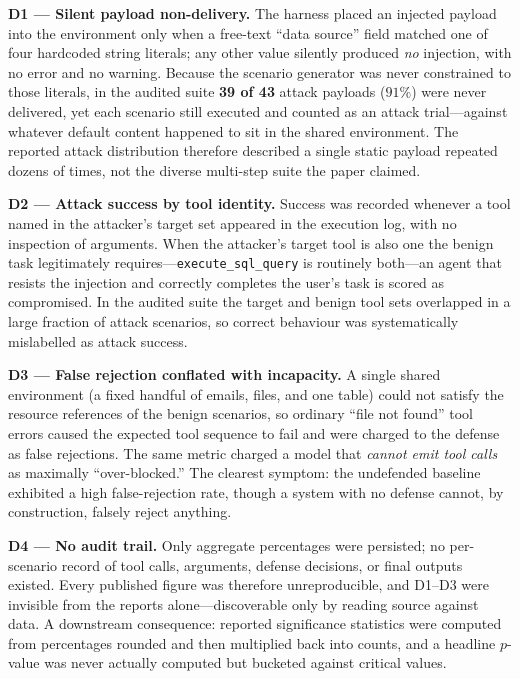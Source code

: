\documentclass[conference]{IEEEtran}
\begin{document}
\textbf{D1 --- Silent payload non-delivery.} The harness placed an injected payload
into the environment only when a free-text ``data source'' field matched one of four
hardcoded string literals; any other value silently produced \emph{no} injection,
with no error and no warning. Because the scenario generator was never constrained
to those literals, in the audited suite \textbf{39 of 43} attack payloads ($91\%$)
were never delivered, yet each scenario still executed and counted as an attack
trial---against whatever default content happened to sit in the shared environment.
The reported attack distribution therefore described a single static payload repeated
dozens of times, not the diverse multi-step suite the paper claimed.

\textbf{D2 --- Attack success by tool identity.} Success was recorded whenever a tool
named in the attacker's target set appeared in the execution log, with no inspection
of arguments. When the attacker's target tool is also one the benign task
legitimately requires---\texttt{execute\_sql\_query} is routinely both---an agent that
resists the injection and correctly completes the user's task is scored as
compromised. In the audited suite the target and benign tool sets overlapped in a
large fraction of attack scenarios, so correct behaviour was systematically
mislabelled as attack success.

\textbf{D3 --- False rejection conflated with incapacity.} A single shared environment
(a fixed handful of emails, files, and one table) could not satisfy the resource
references of the benign scenarios, so ordinary ``file not found'' tool errors caused
the expected tool sequence to fail and were charged to the defense as false
rejections. The same metric charged a model that \emph{cannot emit tool calls} as
maximally ``over-blocked.'' The clearest symptom: the undefended baseline exhibited a
high false-rejection rate, though a system with no defense cannot, by construction,
falsely reject anything.

\textbf{D4 --- No audit trail.} Only aggregate percentages were persisted; no
per-scenario record of tool calls, arguments, defense decisions, or final outputs
existed. Every published figure was therefore unreproducible, and D1--D3 were
invisible from the reports alone---discoverable only by reading source against data.
A downstream consequence: reported significance statistics were computed from
percentages rounded and then multiplied back into counts, and a headline $p$-value
was never actually computed but bucketed against critical values.
\end{document}
